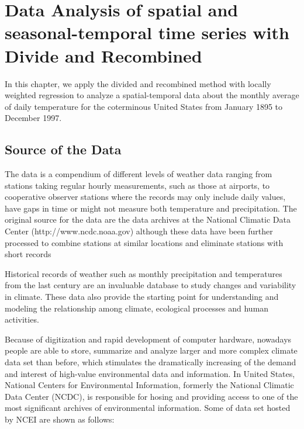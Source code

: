 \chapter{Data Analysis of spatial and seasonal-temporal time series with 
Divide and Recombined}

In this chapter, we apply the divided and recombined method with locally weighted
regression to analyze a spatial-temporal data about the monthly average of daily
temperature for the coterminous United States from January 1895 to December 1997.
\section{Source of the Data}

The data is a compendium of different levels of weather data ranging from stations
taking regular hourly measurements, such as those at airports, to cooperative 
observer stations where the records may only include daily values, have gaps in 
time or might not measure both temperature and precipitation. The original source
for the data are the data archives at the National Climatic Data Center 
(http://www.ncdc.noaa.gov) although these data have been further processed to 
combine stations at similar locations and eliminate stations with short records

Historical records of weather such as monthly precipitation and temperatures from 
the last century are an invaluable database to study changes and variability in 
climate. These data also provide the starting point for understanding and modeling 
the relationship among climate, ecological processes and human activities. 

Because of digitization and rapid development of computer hardware, nowadays
people are able to store, summarize and analyze larger and more 
complex climate data set than before, which stimulates the dramatically 
increasing  of the demand and interest of high-value environmental data and 
information. In United States, National Centers for Environmental Information, 
formerly the National Climatic Data Center (NCDC), is responsible for hosing and 
providing access to one of the most significant archives of environmental 
information. Some of data set hosted by NCEI \cite{NCEI} are shown as follows:

